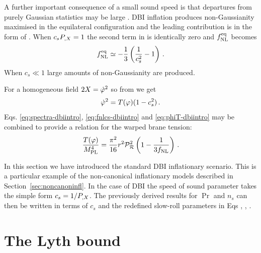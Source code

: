 A further important consequence of a small sound speed is that departures  
from purely Gaussian statistics may be large 
\cite{brane6,brane11,lidser3,chenetal}. 
DBI inflation produces non-Gaussianity maximised in the equilateral
configuration and the leading contribution is in the form of
. 
When $c_sP_{,X}=1$ the second term in 
 is identically zero and $f_{\mathrm{NL}}^{\mathrm{eq}}$ becomes
\cite{chenetal,lidser2}
% 
\begin{equation}
\label{eq:fnlcs-dbiintro}
f_{\mathrm{NL}}^{\mathrm{eq}} \simeq -\frac{1}{3} \left( \frac{1}{c_s^2} -1 \right) \,.
\end{equation}
% 
When $c_s\ll1$ large amounts of non-Gaussianity are produced.

For a homogeneous field $2X = \dot{\varphi}^2$ so from  we
get
\begin{equation}
\label{eq:phiT-dbiintro}
 \dot{\varphi}^2 = T(\varphi)(1-c_s^2)\,.
\end{equation}
Eqs. \eqref{eq:spectra-dbiintro},
\eqref{eq:fnlcs-dbiintro} and \eqref{eq:phiT-dbiintro}
may be combined to provide a relation for the warped brane tension: 
% 
\begin{equation}
\label{eq:obswarp-dbiintro}
\frac{T (\varphi)}{M_{\mathrm{PL}}^4}  = 
\frac{\pi^2}{16} r^2\mathcal{P}_{\mathcal{R}}^2  \left( 1-\frac{1}{3f_{\mathrm{NL}}} \right) \,.
\end{equation}
% 

In this section we have introduced the standard DBI inflationary scenario. This
is a particular example of the non-canonical inflationary models described in
Section~\ref{sec:noncanoninfl}. In the case of DBI the speed of sound parameter
takes the simple form $c_s = 1/P_{,X}$. The previously derived
results for $\Pr$ and $n_s$ can then be written in terms of $c_s$ and the
redefined slow-roll parameters in Eqs ,
, . 

\section{The Lyth bound}
\label{sec:lyth-dbiintro}

